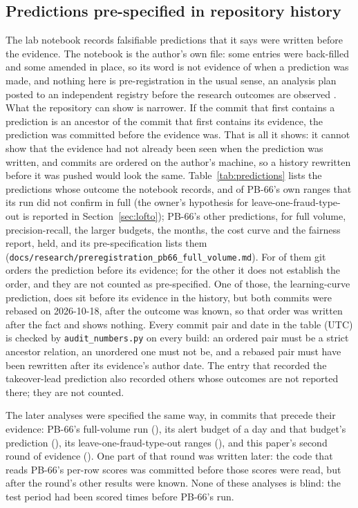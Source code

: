 \subsection{Predictions pre-specified in repository history}

The lab notebook records falsifiable predictions that it says were written before the evidence.
The notebook is the author's own file: some entries were back-filled and some amended in place, so
its word is not evidence of when a prediction was made, and nothing here is pre-registration in the
usual sense, an analysis plan posted to an independent registry before the research outcomes are
observed \cite{nosek2018preregistration}.
What the repository can show is narrower. If the commit that first contains a prediction is an
ancestor of the commit that first contains its evidence, the prediction was committed before the
evidence was. That is all it shows: it cannot show that the evidence had not already been seen when
the prediction was written, and commits are ordered on the author's machine, so a history rewritten
before it was pushed would look the same. Table~\ref{tab:predictions} lists the \nPredTotal{}
predictions whose outcome the notebook records, and \nPredPb{} of PB-66's own ranges that its run did
not confirm in full (the owner's hypothesis for leave-one-fraud-type-out is reported in
Section~\ref{sec:lofto});
PB-66's other predictions, for full volume, precision-recall, the larger budgets, the months, the cost
curve and the fairness report, held, and its pre-specification lists them
(\texttt{docs/research/preregistration\_pb66\_full\_volume.md}). For \nPrespecShown{} of them git orders the
prediction before its evidence; for the other \nPrespecNotShown{} it does not establish the order,
and they are not counted as pre-specified. One of those, the learning-curve prediction, does sit
before its evidence in the history, but both commits were rebased on 2026-10-18, after the outcome was
known, so that order was written after the fact and shows nothing. Every commit pair and date in the
table (UTC) is checked by \texttt{audit\_numbers.py} on every build: an ordered pair must be a strict
ancestor relation, an unordered one must not be, and a rebased pair must have been rewritten after its
evidence's author date. The entry that recorded the takeover-lead prediction also recorded others
whose outcomes are not reported there; they are not counted.

The later analyses were specified the same way, in commits that precede their evidence: PB-66's
full-volume run (), its alert budget of
\nBudKA{} a day and that budget's prediction (), its
leave-one-fraud-type-out ranges (), and this
paper's second round of evidence (). One part of
that round was written later: the code that reads PB-66's per-row scores was committed before those
scores were read, but after the round's other results were known. None of these analyses is blind:
the test period had been scored \nPriorReads{} times before PB-66's run.

